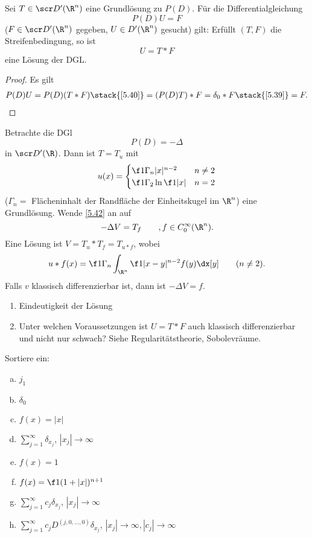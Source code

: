 \begin{st} \label{5.42}
	Sei $T \in \scr D'(\R^n)$ eine Grundlösung zu $P(D)$.
	Für die Differentialgleichung
	\[
		P(D) U = F
	\]
	($F \in \scr D'(\R^n)$ gegeben, $U \in D'(\R^n)$ gesucht)
	gilt:
	Erfüllt $(T,F)$ die Streifenbedingung, so ist
	\[
		U = T \ast F
	\]
	eine Lösung der DGL.
	\begin{proof}
		Es gilt
		\begin{align*}
			P(D) U
			= P(D) (T \ast F)
			\stack{\ref{5.40}}= (P(D) T) \ast F
			= \delta_0 \ast F
			\stack{\ref{5.39}}= F.
		\end{align*}
	\end{proof}
\end{st}

\begin{ex} \label{5.43}
	Betrachte die DGl
	\[
		P(D) = -\Delta
	\]
	in $\scr D'(\R)$.
	Dann ist $T = T_u$ mit
	\[
		u(x) = \begin{cases}
			\f 1{\Gamma_n |x|^{n-2}} & n\neq 2 \\
			\f 1{\Gamma_2} \ln \f 1{|x|} & n= 2
		\end{cases}
	\]
	($\Gamma_n = $ Flächeninhalt der Randfläche der Einheitskugel im $\R^n$)
	eine Grundlösung.
	Wende \ref{5.42} an auf
	\[
		-\Delta V = T_f
		\qquad, f \in C_0^\infty(\R^n).
	\]
	Eine Lösung ist $V = T_u \ast T_f = T_{u\ast f}$, wobei
	\[
		u \ast f(x) = \f 1{\Gamma_n} \int_{\R^n} \f 1{|x-y|^{n-2}} f(y) \dx[y]
		\qquad (n\neq 2).
	\]
	Falls $v$ klassisch differenzierbar ist, dann ist $-\Delta V = f$.
\end{ex}

\begin{nt}
	\begin{enumerate}[1)]
		\item
			Eindeutigkeit der Lösung
		\item
			Unter welchen Voraussetzungen ist $U = T \ast F$ auch klassisch differenzierbar und nicht nur schwach? Siehe Regularitätstheorie, Sobolevräume.
	\end{enumerate}
\end{nt}

\begin{nt}[Veranschaulichung]
	\fixme[Schaubild]
	Sortiere ein:
	\begin{enumerate}[a)]
		\item
			$j_1$
		\item
			$\delta_0$
		\item
			$f(x) = |x|$
		\item
			$\sum_{j=1}^\infty \delta_{x_j}$, $|x_j| \to \infty$
		\item
			$f(x) = 1$
		\item
			$f(x) = \f 1{(1+|x|)^{n+1}}$
		\item
			$\sum_{j=1}^\infty c_j \delta_{x_j}$, $|x_j| \to \infty$
		\item
			$\sum_{j=1}^\infty c_j D^{(j,0,\dotsc, 0)} \delta_{x_j}$, $|x_j| \to \infty, |c_j| \to \infty$
	\end{enumerate}
\end{nt}


